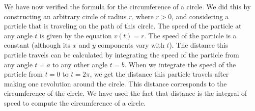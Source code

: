 We have now verified the formula for the circumference of a circle. We did this by constructing an arbitrary circle of radius $r$, where $r > 0$, and considering a particle that is traveling on the path of this circle. The speed of the particle at any angle $t$ is given by the equation $v(t) = r$. The speed of the particle is a constant (although its $x$ and $y$ components vary with $t$). The distance this particle travels can be calculated by integrating the speed of the particle from any angle $t = a$ to any other angle $t = b$. When we integrate the speed of the particle from $t = 0$ to $t = 2\pi$, we get the distance this particle travels after making one revolution around the circle. This distance corresponds to the circumference of the circle. We have used the fact that distance is the integral of speed to compute the circumference of a circle.
